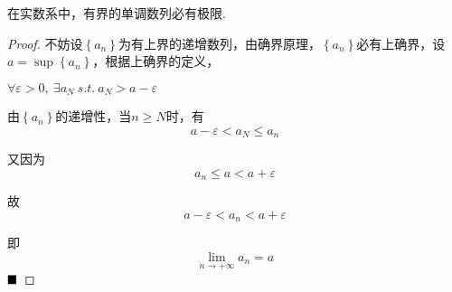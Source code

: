 \begin{theorem}[单调有界收敛定理]
	在实数系中，有界的单调数列必有极限.
\end{theorem}
\begin{proof}
	不妨设$\left\{a_n\right\}$为有上界的递增数列，由确界原理，$\left\{a_n\right\}$必有上确界，设$a=\sup \left\{a_n\right\}$，根据上确界的定义，
	
	$\forall \varepsilon>0,\ \exists a_N \ s.t.\ a_N>a-\varepsilon$
	
	由$\left\{a_n\right\}$的递增性，当$n\geqslant N$时，有
	$$a-\varepsilon<a_N\leqslant a_n$$
	
	又因为$$a_n\leqslant a<a+\varepsilon$$
	
	故$$a-\varepsilon<a_n<a+\varepsilon$$
	
	即$${\lim_{n \to +\infty}a_n}=a$$
	$\hfill\blacksquare$
\end{proof}

